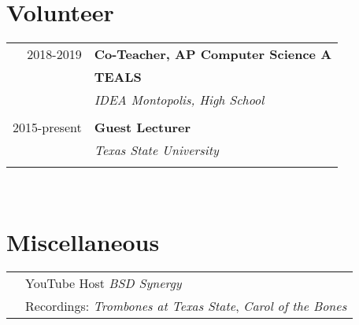 \documentclass[10pt]{article} %
\begin{document}
\begin{minipage}[t]{0.44\textwidth}
\begin{tabular}{rl}
\end{tabular}\\[10pt]



\section{Volunteer} 

\begin{tabular}{rl}
2018-2019     & \textbf{Co-Teacher, AP Computer Science A}\\
& \textbf{TEALS}\\
& \textit{IDEA Montopolis, High School}\\ \\

2015-present & \textbf{Guest Lecturer}\\
& \textit{Texas State University}\\\\

\end{tabular}\\[10pt]


\section{Miscellaneous} 

\begin{tabular}{rl}
& YouTube Host \textit{BSD Synergy}\\
& Recordings: \textit{Trombones at Texas State}, \textit{Carol of the Bones} \\
\end{tabular}\\[10pt]

	
\end{minipage} %
\end{document}
